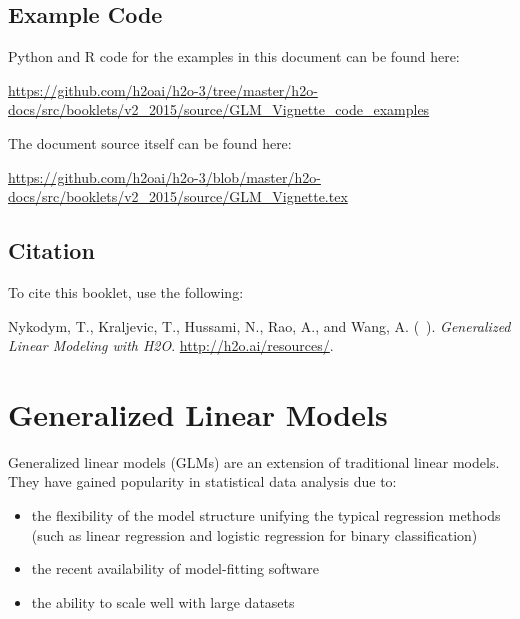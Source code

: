 






\subsection{Example Code}

Python and R code for the examples in this document can be found here:

\url{https://github.com/h2oai/h2o-3/tree/master/h2o-docs/src/booklets/v2_2015/source/GLM_Vignette_code_examples}

The document source itself can be found here:

\url{https://github.com/h2oai/h2o-3/blob/master/h2o-docs/src/booklets/v2_2015/source/GLM_Vignette.tex}

\newpage
\subsection{Citation}

To cite this booklet, use the following: 

Nykodym, T.,  Kraljevic, T., Hussami, N., Rao, A.,  and Wang, A. (\shortmonthname\ \the\year). {\textit{Generalized Linear Modeling with H2O}}. {\url{http://h2o.ai/resources/}}.


\section{Generalized Linear Models}

Generalized linear models (GLMs) are an extension of traditional linear models. They have gained popularity in statistical data analysis due to: 
\begin{itemize}
\item the flexibility of the model structure unifying the typical regression methods (such as linear regression and logistic regression for binary classification)
\item the recent availability of model-fitting software
\item the ability to scale well with large datasets
\end{itemize}


